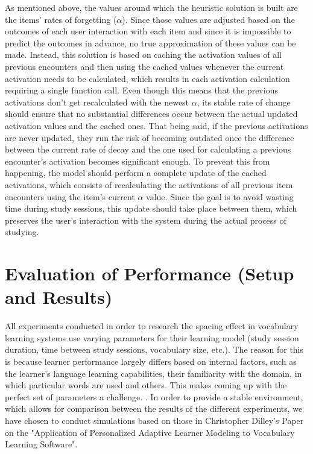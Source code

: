 \documentclass[a4paper]{report}
\begin{document}
As mentioned above, the values around which the heuristic solution is built are the items' rates of forgetting ($\alpha$). Since those values are adjusted based on the outcomes of each user interaction with each item and since it is impossible to predict the outcomes in advance, no true approximation of these values can be made. Instead, this solution is based on caching the activation values of all previous encounters and then using the cached values whenever the current activation needs to be calculated, which results in each activation calculation requiring a single function call. Even though this means that the previous activations don't get recalculated with the newest $\alpha$, its stable rate of change should ensure that no substantial differences occur between the actual updated activation values and the cached ones. That being said, if the previous activations are never updated, they run the risk of becoming outdated once the difference between the current rate of decay and the one used for calculating a previous encounter's activation becomes significant enough. To prevent this from happening, the model should perform a complete update of the cached activations, which consists of recalculating the activations of all previous item encounters using the item's current $\alpha$ value. Since the goal is to avoid wasting time during study sessions, this update should take place between them, which preserves the user's interaction with the system during the actual process of studying.



\chapter{Evaluation of Performance (Setup and Results)}
All experiments conducted in order to research the spacing effect in vocabulary learning systems use varying parameters for their learning model (study session duration, time between study sessions, vocabulary size, etc.). The reason for this is because learner performance largely differs based on internal factors, such as the learner's language learning capabilities, their familiarity with the domain, in which particular words are used and others. This makes coming up with the perfect set of parameters a challenge. \citep{woudenberg08}. In order to provide a stable environment, which allows for comparison between the results of the different experiments, we have chosen to conduct simulations based on those in Christopher Dilley's Paper on the "Application of Personalized Adaptive Learner Modeling to Vocabulary Learning Software". \citep{dilley17}
\end{document}
